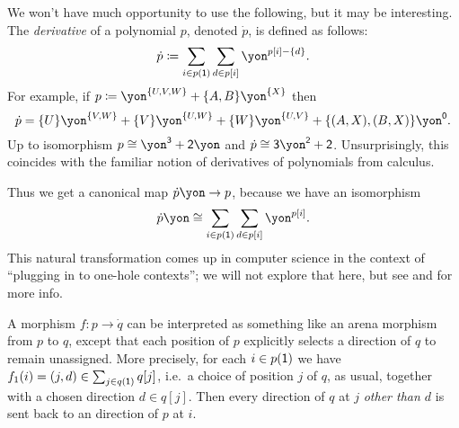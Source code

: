 \documentclass[Book-Poly]{subfiles}
\begin{document}
\begin{example}[Derivatives]\label{ex.derivatives}
We won't have much opportunity to use the following, but it may be interesting. The \emph{derivative} of a polynomial $p$, denoted $\dot{p}$, is defined as follows:
\[
\dot{p}\coloneqq\sum_{i\in p(\1)}\sum_{d\in p[i]}\yon^{p[i]-\{d\}}.
\]
For example, if $p\coloneq\yon^{\{U,V,W\}}+\{A,B\}\yon^{\{X\}}$ then 
\[\dot{p}=\{U\}\yon^{\{V,W\}}+\{V\}\yon^{\{U,W\}}+\{W\}\yon^{\{U,V\}}+\{(A,X),(B,X)\}\yon^\0.\]
Up to isomorphism $p\cong\yon^\3+\2\yon$ and $\dot{p}\cong\3\yon^\2+\2$.
Unsurprisingly, this coincides with the familiar notion of derivatives of polynomials from calculus.

Thus we get a canonical map $\dot{p}\yon\to p$, because we have an isomorphism
\[
\dot{p}\yon\cong\sum_{i\in p(\1)}\sum_{d\in p[i]}\yon^{p[i]}.
\]
This natural transformation comes up in computer science in the context of ``plugging in to one-hole contexts''; we will not explore that here, but see \cite{mcbride} and \cite{abbot2003derivatives} for more info.%

A morphism $f\colon p\to \dot{q}$ can be interpreted as something like an arena morphism from $p$ to $q$, except that each position of $p$ explicitly selects a direction of $q$ to remain unassigned. More precisely, for each $i\in p(\textsf{1})$ we have $f_1(i)=(j,d)\in \sum_{j\in q(\textsf{1})}q[j]$, i.e.\ a choice of position $j$ of $q$, as usual, together with a chosen direction $d\in q[j]$. Then every direction of $q$ at $j$ \emph{other than $d$} is sent back to an direction of $p$ at $i$.
\end{example}
\end{document}
